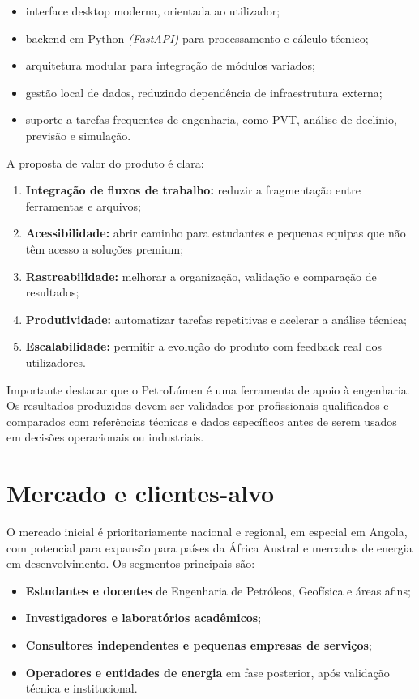 \documentclass[11pt,a4paper]{article}
\begin{document}
\begin{itemize}
    \item interface desktop moderna, orientada ao utilizador;
    \item backend em Python \textit{(FastAPI)} para processamento e cálculo técnico;
    \item arquitetura modular para integração de módulos variados;
    \item gestão local de dados, reduzindo dependência de infraestrutura externa;
    \item suporte a tarefas frequentes de engenharia, como PVT, análise de declínio, previsão e simulação.
\end{itemize}

A proposta de valor do produto é clara:

\begin{enumerate}
    \item \textbf{Integração de fluxos de trabalho:} reduzir a fragmentação entre ferramentas e arquivos;
    \item \textbf{Acessibilidade:} abrir caminho para estudantes e pequenas equipas que não têm acesso a soluções premium;
    \item \textbf{Rastreabilidade:} melhorar a organização, validação e comparação de resultados;
    \item \textbf{Produtividade:} automatizar tarefas repetitivas e acelerar a análise técnica;
    \item \textbf{Escalabilidade:} permitir a evolução do produto com feedback real dos utilizadores.
\end{enumerate}

Importante destacar que o PetroLúmen é uma ferramenta de apoio à engenharia. Os resultados produzidos devem ser validados por profissionais qualificados e comparados com referências técnicas e dados específicos antes de serem usados em decisões operacionais ou industriais.

\section{Mercado e clientes-alvo}
O mercado inicial é prioritariamente nacional e regional, em especial em Angola, com potencial para expansão para países da África Austral e mercados de energia em desenvolvimento. Os segmentos principais são:

\begin{itemize}
    \item \textbf{Estudantes e docentes} de Engenharia de Petróleos, Geofísica e áreas afins;
    \item \textbf{Investigadores e laboratórios acadêmicos};
    \item \textbf{Consultores independentes e pequenas empresas de serviços};
    \item \textbf{Operadores e entidades de energia} em fase posterior, após validação técnica e institucional.
\end{itemize}
\end{document}
